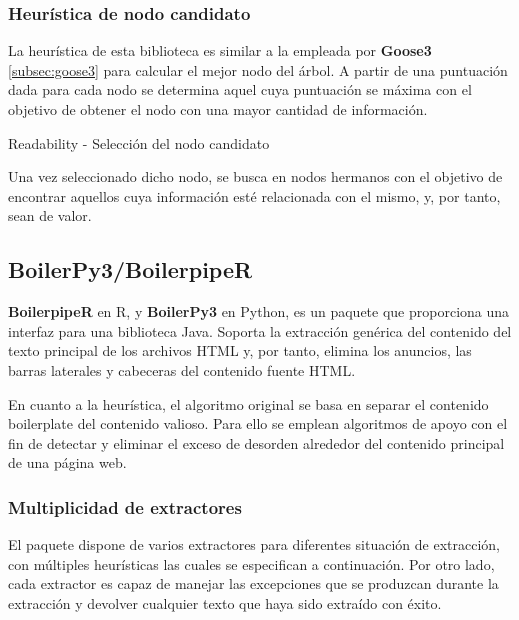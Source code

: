 \subsubsection{Heurística de nodo candidato}
\label{subsubsec:heuristica de nodo candidato}

La heurística de esta biblioteca es similar a la empleada por \textbf{Goose3} \ref{subsec:goose3} para
calcular el mejor nodo del árbol. A partir de una puntuación dada para cada nodo se determina aquel cuya
puntuación se máxima con el objetivo de obtener el nodo con una mayor cantidad de información.

\begin{codefloat}
  
  \caption{Readability - Selección del nodo candidato}
  \label{cod:readability - seleccion del nodo candidato}
\end{codefloat}

Una vez seleccionado dicho nodo, se busca en nodos hermanos con el objetivo de encontrar aquellos cuya
información esté relacionada con el mismo, y, por tanto, sean de valor.

\subsection{BoilerPy3/BoilerpipeR}
\label{subsec:boilerpy/boilerpiper}

\textbf{BoilerpipeR} \cite{boilerpipeR-cran} en R, y \textbf{BoilerPy3} \cite{boilerpy} en Python, es un 
paquete que proporciona una interfaz para una biblioteca Java. Soporta la extracción genérica del contenido 
del texto principal de los archivos HTML y, por tanto, elimina los anuncios, las barras laterales y 
cabeceras del contenido fuente HTML.

En cuanto a la heurística, el algoritmo original se basa en separar el contenido boilerplate del contenido
valioso. Para ello se emplean algoritmos de apoyo con el fin de detectar y eliminar el exceso de desorden
alrededor del contenido principal de una página web.

\subsubsection{Multiplicidad de extractores}
\label{subsubsec:multiplicidad de extractores}

El paquete dispone de varios extractores para diferentes situación de extracción, con múltiples heurísticas
las cuales se especifican a continuación. Por otro lado, cada extractor es capaz de manejar las excepciones 
que se produzcan durante la extracción y devolver cualquier texto que haya sido extraído con éxito.

